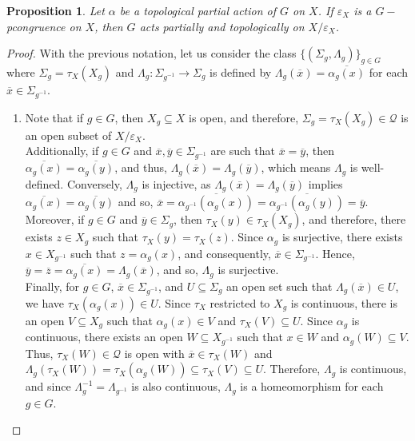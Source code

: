 \documentclass[sn-mathphys-num]{sn-jnl}%
\theoremstyle{thmstyleone}%
\newtheorem{proposition}[theorem]{Proposition}%
\theoremstyle{thmstyletwo}%
\theoremstyle{thmstylethree}%
\begin{document}
\begin{proposition}\label{quotient}
Let $ \alpha $ be a topological partial action of $ G $ on $ X $. If $ \varepsilon_X $ is a $G-$pcongruence on $ X $, then $ G $ acts partially and topologically on $ X /\varepsilon_X $.
\end{proposition}
\begin{proof}
With the previous notation, let us consider the class $ \{(\Sigma_g, \Lambda_g) \}_{g \in G} $ where $ \Sigma_g = \tau_X(X_g) $ and $ \Lambda_g: \Sigma_{g^{-1}} \to \Sigma_{g} $ is defined by $ \Lambda_g (\overline {x}) = \overline {\alpha_g (x)} $ for each $\overline{x}\in \Sigma_{g^{-1}}$.
\begin{enumerate}
\item Note that if $ g \in G $, then $X_g\subseteq X$ is open, and therefore, $\Sigma_g = \tau_X (X_g) \in \mathcal{Q}$ is an open subset of $ X / \varepsilon_X$.\\

Additionally, if $ g \in G $ and $ \overline{x}, \overline{y}\in \Sigma_{g^{-1}} $ are such that $ \overline {x} = \overline {y} $, then $ \overline{\alpha_g (x)} = \overline {\alpha_g (y)} $, and thus, $ \Lambda_g (\overline {x}) = \Lambda_g (\overline {y}) $, which means $ \Lambda_g $ is well-defined. Conversely, $ \Lambda_g $ is injective, as
$ \Lambda_g (\overline {x})=\Lambda_g (\overline {y})$ implies $\overline{\alpha_g (x)} = \overline {\alpha_g (y)}$ and so, $\overline{x}=\overline{\alpha_{g^{-1}} (\alpha_g (x))} = \overline {\alpha_{g^{-1}}(\alpha_g (y))}=\overline{y}$. Moreover, if $ g \in G $ and $ \overline{y} \in\Sigma_g $, then $\tau_X(y)\in \tau_X(X_g)$, and therefore,  there exists $z \in X_g $ such that $\tau_X(y)=\tau_X(z)$. Since $ \alpha_g $ is surjective, there exists $ x \in X_{g^{-1}} $ such that $ z = \alpha_g (x) $, and consequently, $ \overline {x} \in \Sigma_{g^{-1}} $. Hence, $ \overline{y} = \overline{z}= \overline{\alpha_g (x)}=\Lambda_g (\overline{x})$, and so, $ \Lambda_g $ is surjective.\\

Finally, for $ g \in G $, $ \overline{x} \in \Sigma_{g^{-1}} $, and $ U \subseteq \Sigma_{g} $ an open set such that $  \Lambda_g (\overline {x}) \in U $, we have $\tau_X(\alpha_g (x)) \in U $. Since $ \tau_X $ restricted to $X_{g}$ is continuous, there is an open $V\subseteq X_{g}$ such that $\alpha_g (x)\in V$ and $\tau_X(V) \subseteq U$. Since $\alpha_g$ is continuous, there exists an open $ W\subseteq X_{g^{-1}}$ such that $ x \in W $ and $ \alpha_g (W) \subseteq V $. Thus, $ \tau_X (W)\in \mathcal{Q}$ is open with $ \overline {x} \in \tau_X (W) $ and $ \Lambda_g (\tau_X (W))= \tau_X (\alpha_g(W)) \subseteq  \tau_X (V) \subseteq U $. Therefore, $ \Lambda_g $ is continuous, and since $ \Lambda_g^{-1} = \Lambda_{g{^{-1}}}$ is also continuous, $ \Lambda_g $ is a homeomorphism for each $ g \in G $.


\end{enumerate}
\end{proof}
\end{document}
